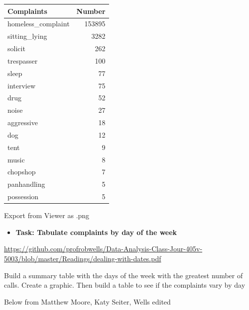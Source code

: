 \documentclass[]{book}
\newenvironment{Shaded}{\begin{snugshade}}{\end{snugshade}}
\newcommand{\DataTypeTok}[1]{\textcolor[rgb]{0.13,0.29,0.53}{#1}}
\newcommand{\KeywordTok}[1]{\textcolor[rgb]{0.13,0.29,0.53}{\textbf{#1}}}
\newcommand{\NormalTok}[1]{#1}
\newcommand{\OperatorTok}[1]{\textcolor[rgb]{0.81,0.36,0.00}{\textbf{#1}}}
\newcommand{\OtherTok}[1]{\textcolor[rgb]{0.56,0.35,0.01}{#1}}
\newcommand{\StringTok}[1]{\textcolor[rgb]{0.31,0.60,0.02}{#1}}
\providecommand{\tightlist}{%
  \setlength{\itemsep}{0pt}\setlength{\parskip}{0pt}}
\begin{document}
\begin{table}
\centering
\begin{tabular}{l|r}
\hline
Complaints & Number\\
\hline
homeless\_complaint & 153895\\
\hline
sitting\_lying & 3282\\
\hline
solicit & 262\\
\hline
trespasser & 100\\
\hline
sleep & 77\\
\hline
interview & 75\\
\hline
drug & 52\\
\hline
noise & 27\\
\hline
aggressive & 18\\
\hline
dog & 12\\
\hline
tent & 9\\
\hline
music & 8\\
\hline
chopshop & 7\\
\hline
panhandling & 5\\
\hline
possession & 5\\
\hline
\end{tabular}
\end{table}

Export from Viewer as .png

\begin{itemize}
\tightlist
\item
  \textbf{Task: Tabulate complaints by day of the week}
\end{itemize}

\url{https://github.com/profrobwells/Data-Analysis-Class-Jour-405v-5003/blob/master/Readings/dealing-with-dates.pdf}

\begin{Shaded}
\end{Shaded}

Build a summary table with the days of the week with the greatest
number of calls. Create a graphic. Then build a table to see if the complaints vary by day

Below from Matthew Moore, Katy Seiter, Wells edited
\end{document}
